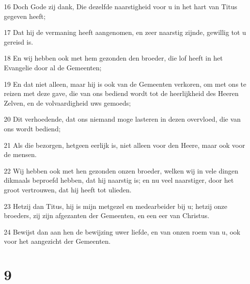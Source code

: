 \par 16 Doch Gode zij dank, Die dezelfde naarstigheid voor u in het hart van Titus gegeven heeft;
\par 17 Dat hij de vermaning heeft aangenomen, en zeer naarstig zijnde, gewillig tot u gereisd is.
\par 18 En wij hebben ook met hem gezonden den broeder, die lof heeft in het Evangelie door al de Gemeenten;
\par 19 En dat niet alleen, maar hij is ook van de Gemeenten verkoren, om met ons te reizen met deze gave, die van ons bediend wordt tot de heerlijkheid des Heeren Zelven, en de volvaardigheid uws gemoeds;
\par 20 Dit verhoedende, dat ons niemand moge lasteren in dezen overvloed, die van ons wordt bediend;
\par 21 Als die bezorgen, hetgeen eerlijk is, niet alleen voor den Heere, maar ook voor de mensen.
\par 22 Wij hebben ook met hen gezonden onzen broeder, welken wij in vele dingen dikmaals beproefd hebben, dat hij naarstig is; en nu veel naarstiger, door het groot vertrouwen, dat hij heeft tot ulieden.
\par 23 Hetzij dan Titus, hij is mijn metgezel en medearbeider bij u; hetzij onze broeders, zij zijn afgezanten der Gemeenten, en een eer van Christus.
\par 24 Bewijst dan aan hen de bewijzing uwer liefde, en van onzen roem van u, ook voor het aangezicht der Gemeenten.

\chapter{9}

